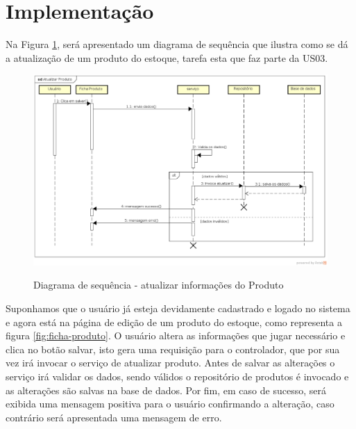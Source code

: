 \documentclass[a4paper,12pt]{monografia}
\begin{document}

\section{Implementação} %
\label{sec:implementacao}

Na Figura \ref{fig:sd-atualiza}, será apresentado um diagrama de sequência que ilustra como se dá a atualização de um produto do estoque, tarefa esta que faz parte da US03.

\begin{figure}[H]
\centering
\caption{Diagrama de sequência - atualizar informações do Produto}
\centering
\includegraphics[width=16cm]{img/diagramas/sd-atualiza-produto.eps}\\
\label{fig:sd-atualiza}
\end{figure}

Suponhamos que o usuário já esteja devidamente cadastrado e logado no sistema e agora está na página de edição de um produto do estoque, como representa a figura \ref{fig:ficha-produto}. O usuário altera as informações que jugar necessário e clica no botão salvar, isto gera uma requisição para o controlador, que por sua vez irá invocar o serviço de atualizar produto. Antes de salvar as alterações o serviço irá validar os dados, sendo válidos o repositório de produtos é invocado e as alterações são salvas na base de dados. Por fim,  em caso de sucesso, será exibida uma mensagem positiva para o usuário confirmando a alteração, caso contrário será apresentada uma mensagem de erro.
\end{document}
